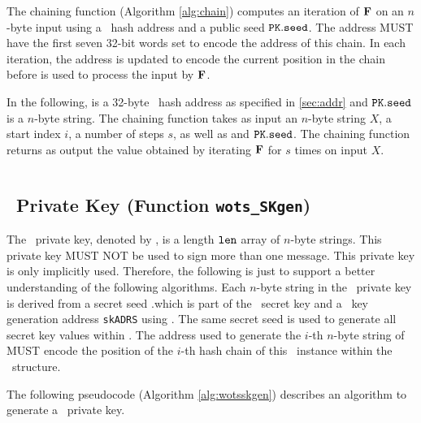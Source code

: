 The chaining function (Algorithm \ref{alg:chain}) computes an iteration of $\mathbf{F}$ on an $n$-byte input using
a \WOTSCS\ hash address \ADRS and a public seed $\pk.\seed$. The address \ADRS MUST
have the first seven 32-bit words set to encode the address of this chain. In each iteration, the address is updated to encode the current position in the chain before \ADRS is used to process the input by $\mathbf{F}$.

In the following, \ADRS is a 32-byte \WOTSCS\ hash address as specified in \cref{sec:addr} and $\pk.\seed$ is a $n$-byte string. The chaining function takes as input an $n$-byte string $X$, a start index $i$, a number of steps $s$, as well as \ADRS and $\pk.\seed$. The chaining function returns as output the value obtained by iterating $\mathbf{F}$ for $s$ times on input $X$.

\begin{algorithm}
\inputminted[breaklines,linenos,tabsize=2,mathescape,escapeinside=||]{C}{paper/code/chain.cs}
\caption{{\tt chain} --- Chaining function used in \WOTSCS.}
\label{alg:chain}
\end{algorithm}


\subsection{\WOTSCS\ Private Key (Function \texttt{wots\_SKgen})}

The \WOTSCS\ private key, denoted by \sk, is a length $\tt len$ array of $n$-byte strings. This private key MUST NOT be used to sign more than one message. This private key is only implicitly used. Therefore, the following is just to support a better understanding of the following algorithms. Each $n$-byte string in the \WOTSCS\ private key is derived from a secret seed \sk.\seed which is part of the \SPHINCSA\ secret key and a \WOTSCS\ key generation address \texttt{skADRS} using \PRF. The same secret seed is used to generate all secret key values within \SPHINCSA. The address used to generate the $i$-th $n$-byte string of \sk MUST encode the position of the $i$-th hash chain of this \WOTSCS\ instance within the \SPHINCSA\ structure. 

The following pseudocode (Algorithm \ref{alg:wotsskgen}) describes an algorithm to generate a \WOTSCS\ private key.

\begin{algorithm}
\inputminted[breaklines,linenos,tabsize=2,mathescape,escapeinside=||]{C}{paper/code/wots_SKgen.cs}
\caption{\texttt{wots\_SKgen} --- Generating a \WOTSCS\ private key.}
\label{alg:wotsskgen}
\end{algorithm}

